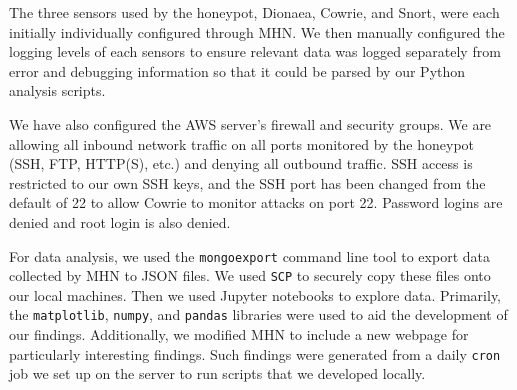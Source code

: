 The three sensors used by the honeypot, Dionaea, Cowrie, and Snort, were each initially individually configured through MHN. We then manually configured the logging levels of each sensors to ensure relevant data was logged separately from error and debugging information so that it could be parsed by our Python analysis scripts. 

We have also configured the AWS server's firewall and security groups. We are allowing all inbound network traffic on all ports monitored by the honeypot (SSH, FTP, HTTP(S), etc.) and denying all outbound traffic. SSH access is restricted to our own SSH keys, and the SSH port has been changed from the default of 22 to allow Cowrie to monitor attacks on port 22. Password logins are denied and root login is also denied. 

For data analysis, we used the \texttt{mongoexport} command line tool to export data collected by MHN to JSON files. We used \texttt{SCP} to securely copy these files onto our local machines. Then we used Jupyter notebooks to explore data. Primarily, the \texttt{matplotlib}, \texttt{numpy}, and \texttt{pandas} libraries were used to aid the development of our findings. Additionally, we modified MHN to include a new webpage for particularly interesting findings. Such findings were generated from a daily \texttt{cron} job we set up on the server to run scripts that we developed locally.